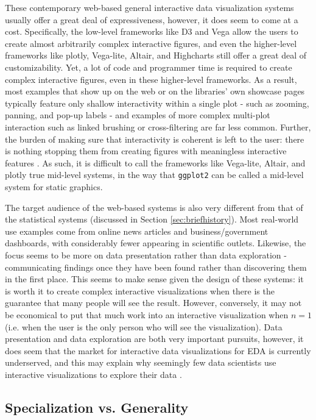 \documentclass[12pt,a4paper]{article}
\begin{document}
These contemporary web-based general interactive data visualization systems usually offer a great deal of expressiveness, however, it does seem to come at a cost. Specifically, the low-level frameworks like D3 and Vega allow the users to create almost arbitrarily complex interactive figures, and even the higher-level frameworks like plotly, Vega-lite, Altair, and Highcharts still offer a great deal of customizability. Yet, a lot of code and programmer time is required to create complex interactive figures, even in these higher-level frameworks. As a result, most examples that show up on the web or on the libraries' own showcase pages typically feature only shallow interactivity within a single plot - such as zooming, panning, and pop-up labels - and examples of more complex multi-plot interaction such as linked brushing or cross-filtering are far less common. Further, the burden of making sure that interactivity is coherent is left to the user: there is nothing stopping them from creating figures with meaningless interactive features \citep[although recently there has been some effort to formalize, see e.g.][]{moritz2018}. As such, it is difficult to call the frameworks like Vega-lite, Altair, and plotly true mid-level systems, in the way that \texttt{ggplot2} can be called a mid-level system for static graphics.  

The target audience of the web-based systems is also very different from that of the statistical systems (discussed in Section \ref{sec:briefhistory}). Most real-world use examples come from online news articles and business/government dashboards, with considerably fewer appearing in scientific outlets. Likewise, the focus seems to be more on data presentation rather than data exploration - communicating findings once they have been found rather than discovering them in the first place. This seems to make sense given the design of these systems: it is worth it to create complex interactive visualizations when there is the guarantee that many people will see the result. However, conversely, it may not be economical to put that much work into an interactive visualization when $n = 1$ (i.e. when the user is the only person who will see the visualization). Data presentation and data exploration are both very important pursuits, however, it does seem that the market for interactive data visualizations for EDA is currently underserved, and this may explain why seemingly few data scientists use interactive visualizations to explore their data \citep{batch2017}.  

\subsection{Specialization vs. Generality}
\end{document}
